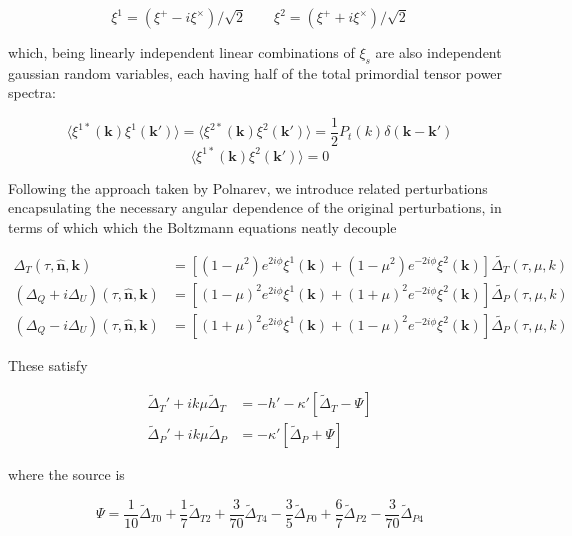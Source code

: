 \documentclass[a4paper,10pt]{article}
\renewcommand{\v}[1]{\mathbf{#1}}
\newcommand{\half}{\frac{1}{2}}
\newcommand{\unit}[1]{\hat{\v{#1}}}
\begin{document}
\begin{equation}
\xi^1 = (\xi^+ - i\xi^\times)/\sqrt{2} \qquad \xi^2 = (\xi^+ + i\xi^\times)/\sqrt{2}
\end{equation}

which, being linearly independent linear combinations of $\xi_s$ are also independent gaussian random variables, each having half of the total primordial tensor power spectra:

\begin{equation}
\langle \xi^{1*}(\v{k})\xi^{1}(\v{k'})\rangle=\langle \xi^{2*}(\v{k})\xi^{2}(\v{k'})\rangle=\half P_t(k)\delta(\v{k}-\v{k'})
\end{equation}
\begin{equation}
\langle \xi^{1*}(\v{k})\xi^{2}(\v{k'})\rangle=0
\end{equation}

Following the approach taken by Polnarev, we introduce related perturbations encapsulating the necessary angular dependence of the original perturbations, in terms of which  which the Boltzmann equations neatly decouple

\begin{equation}\begin{split}
\Delta_T(\tau,\unit{n},\v{k}) &= [(1-\mu^2) e^{2i\phi} \xi^1(\v{k})+(1-\mu^2) e^{-2i\phi} \xi^2(\v{k})]\tilde{\Delta_T}(\tau,\mu,k)\\
(\Delta_Q+i\Delta_U)(\tau,\unit{n},\v{k}) &=[(1-\mu)^2 e^{2i\phi} \xi^1(\v{k})+(1+\mu)^2 e^{-2i\phi} \xi^2(\v{k})]\tilde{\Delta_P}(\tau,\mu,k) \\
(\Delta_Q-i\Delta_U)(\tau,\unit{n},\v{k}) &=[(1+\mu)^2 e^{2i\phi} \xi^1(\v{k})+(1-\mu)^2 e^{-2i\phi} \xi^2(\v{k})]\tilde{\Delta_P}(\tau,\mu,k)
\end{split}\end{equation}

These satisfy

\begin{equation}\begin{split}
\tilde{\Delta}_T'+ik\mu \tilde{\Delta}_T &= -h' -\kappa'[\tilde{\Delta}_T - \Psi]\\
\tilde{\Delta}_P'+ik\mu\tilde{\Delta}_P &= -\kappa'[\tilde{\Delta}_P + \Psi]
\end{split}\end{equation}

where the source is

\begin{equation}
\Psi = \frac{1}{10}\tilde{\Delta}_{T0} + \frac{1}{7}\tilde{\Delta}_{T2} + \frac{3}{70}\tilde{\Delta}_{T4} - \frac{3}{5}\tilde{\Delta}_{P0} + \frac{6}{7}\tilde{\Delta}_{P2} - \frac{3}{70}\tilde{\Delta}_{P4}
\end{equation}
\end{document}
